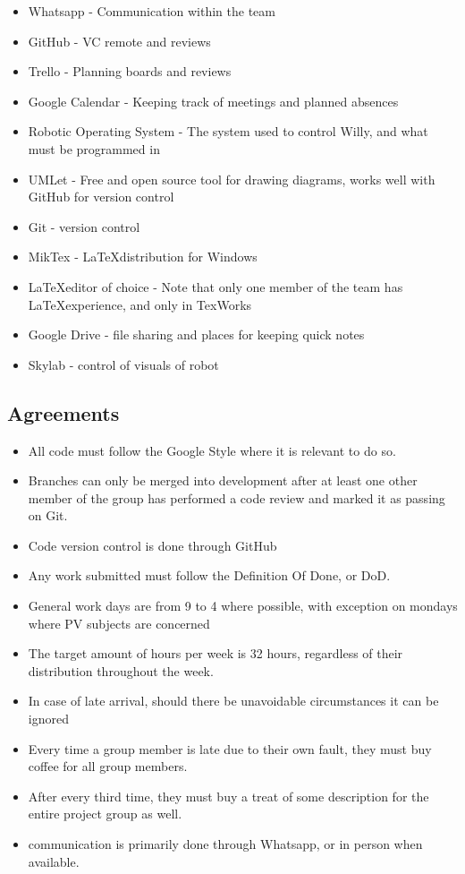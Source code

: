 \begin{itemize}
\item Whatsapp - Communication within the team
\item GitHub - VC remote and reviews
\item Trello - Planning boards and reviews
\item Google Calendar  - Keeping track of meetings and planned absences
\item Robotic Operating System - The system used to control Willy, and what must be programmed in
\item UMLet - Free and open source tool for drawing diagrams, works well with GitHub for version control
\item Git - version control
\item MikTex - \LaTeX distribution for Windows
\item \LaTeX editor of choice - Note that only one member of the team has \LaTeX experience, and only in TexWorks
\item Google Drive - file sharing and places for keeping quick notes
\item Skylab - control of visuals of robot
\end{itemize}

\subsection{Agreements}
\begin{itemize}
	\item All code must follow the Google Style where it is relevant to do so.
	\item Branches can only be merged into development after at least one other member of the group has performed a code review and marked it as passing on Git.
	\item Code version control is done through GitHub
	\item Any work submitted must follow the Definition Of Done, or DoD.
\item General work days are from 9 to 4 where possible, with exception on mondays where PV subjects are concerned
\item The target amount of hours per week is 32 hours, regardless of their distribution throughout the week.
\item In case of late arrival, should there be unavoidable circumstances it can be ignored
\item Every time a group member is late due to their own fault, they must buy coffee for all group members.
\item After every third time, they must buy a treat of some description for the entire project group as well.
\item communication is primarily done through Whatsapp, or in person when available.
\end{itemize}
\newpage
